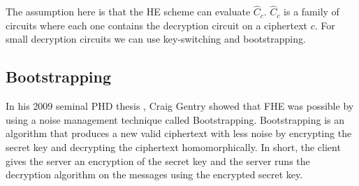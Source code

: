 The assumption here is that the HE scheme can evaluate $\hat{C}_c$. $\hat{C}_c$ is a family of circuits where each one contains the decryption circuit on a ciphertext $c$. For small decryption circuits we can use key-switching and bootstrapping.







\subsection*{Bootstrapping}
In his 2009 seminal PHD thesis \cite{Gentry-Thesis}, Craig Gentry showed that FHE was possible by using a noise management technique called Bootstrapping. Bootstrapping is an algorithm that produces a new valid ciphertext with less noise by encrypting the secret key and decrypting the ciphertext homomorphically. In short, the client gives the server an encryption of the secret key and the server runs the decryption algorithm on the messages using the encrypted secret key.


